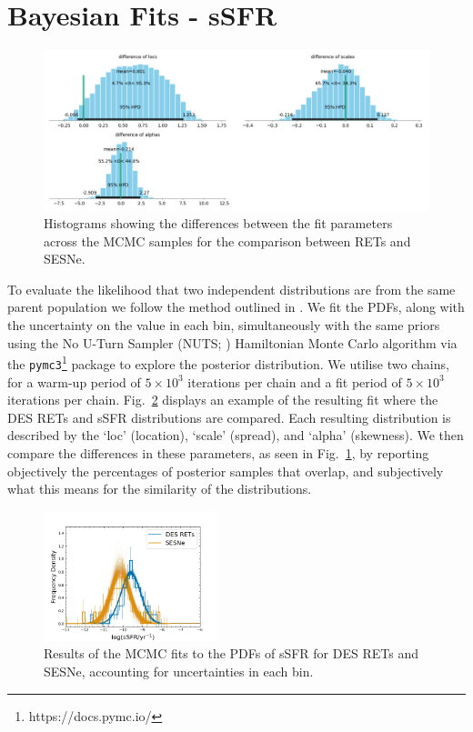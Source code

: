 \documentclass[fleqn,usenatbib,]{mnras}
\begin{document}
\section{Bayesian Fits - sSFR}
\label{app:b}
\begin{figure}
\includegraphics[width=\textwidth]{mc_figs/rets_s12_param_diffs_ssfr_final.png}
\caption{Histograms showing the differences between the fit parameters across the MCMC samples for the comparison between RETs and SESNe. 
\label{fig:param_diffs}}
\end{figure}

To evaluate the likelihood that two independent distributions are from the same parent population we follow the method outlined in . We fit the PDFs, along with the uncertainty on the value in each bin, simultaneously with the same priors using the No U-Turn Sampler (NUTS; \citealt{Hoffman2014}) Hamiltonian Monte Carlo algorithm via the  \texttt{pymc3}\footnote{https://docs.pymc.io/} package to explore the posterior distribution. We utilise two chains, for a warm-up period of $5\times10^3$ iterations per chain and a fit period of $5\times10^3$ iterations per chain. Fig.~\ref{fig:histfit_s12_ssfr} displays an example of the resulting fit where the DES RETs and \citet{Sanders2012} sSFR distributions are compared. Each resulting distribution is described by the `loc' (location), `scale' (spread), and `alpha' (skewness). We then compare the differences in these parameters, as seen in Fig.~\ref{fig:param_diffs}, by reporting objectively the percentages of posterior samples that overlap, and subjectively what this means for the similarity of the distributions.

\begin{figure}
\includegraphics[width=0.45\textwidth]{mc_figs/rets_s12_histfit_ssfr_final.png}
\caption{Results of the MCMC fits to the PDFs of sSFR for DES RETs and SESNe, accounting for uncertainties in each bin.
\label{fig:histfit_s12_ssfr}}
\end{figure}
\end{document}
